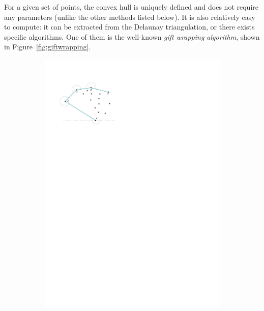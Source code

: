 For a given set of points, the convex hull is uniquely defined and does not require any parameters (unlike the other methods listed below).
It is also relatively easy to compute: it can be extracted from the Delaunay triangulation, or there exists specific algorithms.
One of them is the well-known \emph{gift wrapping algorithm}, shown in Figure~\ref{fig:giftwrapping}.
\begin{figure}
  \centering
  \centering
  \begin{subfigure}[b]{0.45\linewidth}
    \centering
    \includegraphics[page=1,width=\textwidth]{figs/giftwrapping.pdf}
    \caption{}
  \end{subfigure}%
  \qquad
  \begin{subfigure}[b]{0.45\linewidth}
    \centering

\end{subfigure}
\end{figure}
